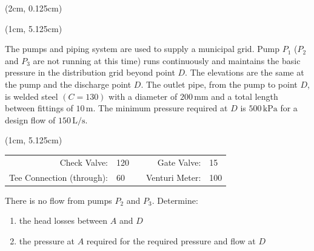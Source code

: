 \documentclass[9pt,xcolor={svgnames, x11names},mathpazo, professionalfonts]{beamer}
\begin{document}
\begin{frame}
	
	\begin{textblock*}{0.75\columnwidth}(2cm, 0.125cm)
	\end{textblock*}
	
	
	
	\begin{textblock*}{1.05\columnwidth}(1cm, 5.125cm)
		\begin{myexam}[left=0.375cm, right=0.25cm]{}{}
			\raggedright
			\vspace{-0.25cm}
			The pumps and piping system are used to supply a municipal grid.
			Pump $P_1$ ($P_2$ and $P_3$ are not running at this time) runs continuously and maintains the
			basic pressure in the distribution grid beyond point $D$.
			The elevations are the same at the pump and the discharge
			point $D$.
			\pars
			The outlet pipe, from the pump to point $D$, is welded steel $(C = 130)$ with a diameter of
			$200\,\text{mm}$ and a total length between fittings of $10\,\text{m}$.
			\pars
			The minimum pressure required at $D$ is
			$500\,\text{kPa}$ for a design flow of $150\,\text{L/s}$.
			\vspace{-0.25cm}
		\end{myexam}
	\end{textblock*}
\end{frame}
\begin{frame}
	\begin{textblock*}{1.05\columnwidth}(1cm, 5.125cm)
		\begin{mybox}[title=Cont'd\ldots]{}{}
			\raggedright
			\begin{center}
				\begin{tabular}{rlcrl}
					Check Valve:              & 120 &   & Gate Valve:    & 15  \\
					Tee Connection (through): & 60  &   & Venturi Meter: & 100 
				\end{tabular}
			\end{center}
			\par\medskip
			There is no flow from pumps $P_2$ and $P_3$. Determine:
			\begin{enumerate}
				\item the head losses between $A$ and $D$
				\item the pressure at $A$ required for the required pressure and flow at $D$
			\end{enumerate}
		\end{mybox}
	\end{textblock*}
	
\end{frame}
\end{document}
